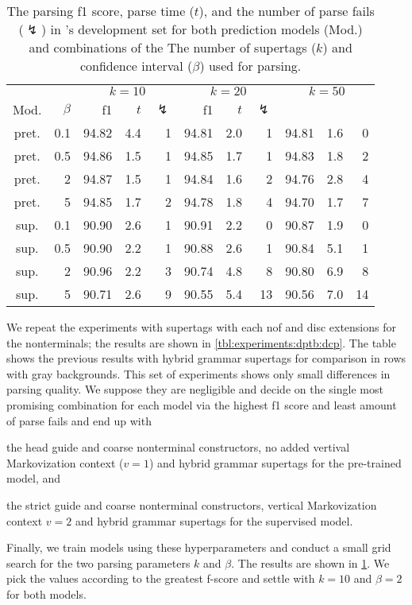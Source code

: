 \documentclass[../../document.tex]{subfiles}
\begin{document}
    \begin{table}
        \caption{\label{tbl:experiments:dptb:k}
        The parsing f1 score, parse time ($t$), and the number of parse fails ($\lightning$) in \dptb{}'s development set for both prediction models (Mod.) and combinations of the The number of supertags ($k$) and confidence interval ($\beta$) used for parsing.
        }
        \centering
        \setlength{\tabcolsep}{4pt}
        \vspace{.2cm}
        \begin{tabular}{cr|rrr|rrr|rrr}
            \toprule
&     &       \multicolumn{3}{c|}{$k = 10$} & \multicolumn{3}{c|}{$k = 20$} & \multicolumn{3}{c}{$k = 50$} \\
Mod. &  $\beta$  & f1 & $t$ & $\lightning$ & f1 & $t$ & $\lightning$ \\ \hline
pret. & 0.1  & 94.82 & 4.4 & 1 & 94.81 & 2.0 & 1 & 94.81 & 1.6 & 0 \\
pret. & 0.5  & 94.86 & 1.5 & 1 & 94.85 & 1.7 & 1 & 94.83 & 1.8 & 2 \\
pret. &   2  & 94.87 & 1.5 & 1 & 94.84 & 1.6 & 2 & 94.76 & 2.8 & 4 \\
pret. &   5  & 94.85 & 1.7 & 2 & 94.78 & 1.8 & 4 & 94.70 & 1.7 & 7 \\
\midrule 
sup. & 0.1  & 90.90 & 2.6 & 1 & 90.91 & 2.2 &  0 & 90.87 & 1.9 &  0 \\
sup. & 0.5  & 90.90 & 2.2 & 1 & 90.88 & 2.6 &  1 & 90.84 & 5.1 &  1 \\
sup. &   2  & 90.96 & 2.2 & 3 & 90.74 & 4.8 &  8 & 90.80 & 6.9 &  8 \\
sup. &   5  & 90.71 & 2.6 & 9 & 90.55 & 5.4 & 13 & 90.56 & 7.0 & 14 \\
    \bottomrule
        \end{tabular}
    \end{table}

    We repeat the experiments with  supertags with each nof and disc extensions for the nonterminals; the results are shown in \cref{tbl:experiments:dptb:dcp}.
    The table shows the previous results with hybrid grammar supertags for comparison in rows with gray backgrounds.
    This set of experiments shows only small differences in parsing quality.
    We suppose they are negligible and decide on the single most promising combination for each model via the highest f1 score and least amount of parse fails and end up with
    \begin{compactitem}
        \item the head guide and coarse nonterminal constructors, no added vertival Markovization context ($v=1$) and hybrid grammar supertags for the pre-trained model, and
        \item the strict guide and coarse nonterminal constructors, vertical Markovization context \(v=2\) and hybrid grammar supertags for the supervised model.
    \end{compactitem}
    Finally, we train models using these hyperparameters and conduct a small grid search for the two parsing parameters \(k\) and \(\beta\). The results are shown in \cref{tbl:experiments:dptb:k}.
    We pick the values according to the greatest f-score and settle with \(k=10\) and \(\beta=2\) for both models.
\end{document}
